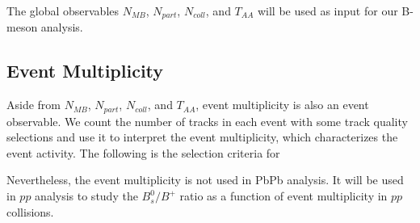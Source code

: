 The global observables $N_{MB}$, $N_{part}$, $N_{coll}$, and $T_{AA}$ will be used as input for our B-meson analysis. 

\subsection{Event Multiplicity}

Aside from $N_{MB}$, $N_{part}$, $N_{coll}$, and $T_{AA}$, event multiplicity is also an event observable. We count the number of tracks in each event with some track quality selections and use it to interpret the event multiplicity, which characterizes the event activity. The following is the selection criteria for 

Nevertheless, the event multiplicity is not used in PbPb analysis. It will be used in $pp$ analysis to study the $B^0_s/B^+$ ratio as a function of event multiplicity in $pp$ collisions.






